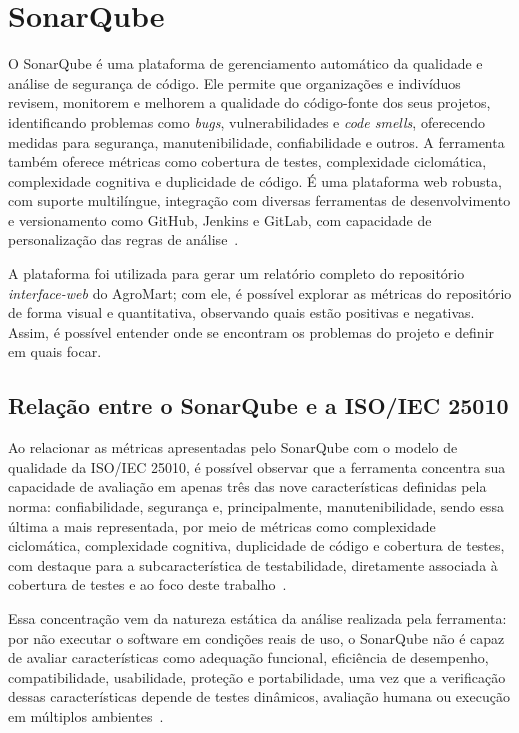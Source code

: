 
\section{SonarQube}

O SonarQube é uma plataforma de gerenciamento automático da qualidade e análise de segurança de código.
Ele permite que organizações e indivíduos revisem, monitorem e melhorem a qualidade do código-fonte dos seus projetos,
identificando problemas como \textit{bugs}, vulnerabilidades e \textit{code smells}, oferecendo medidas para segurança, manutenibilidade, confiabilidade e outros.
A ferramenta também oferece métricas como cobertura de testes, complexidade ciclomática, complexidade cognitiva e duplicidade de código.
É uma plataforma web robusta, com suporte multilíngue, integração com diversas ferramentas de desenvolvimento e versionamento como GitHub, Jenkins e GitLab,
com capacidade de personalização das regras de análise~\cite{sonarqube}.

A plataforma foi utilizada para gerar um relatório completo do repositório \textit{interface-web} do AgroMart; com ele, é possível explorar as métricas do repositório de forma visual e quantitativa,
observando quais estão positivas e negativas. Assim, é possível entender onde se encontram os problemas do projeto e definir em quais focar.


\subsection{Relação entre o SonarQube e a ISO/IEC 25010}

Ao relacionar as métricas apresentadas pelo SonarQube com o modelo de qualidade da ISO/IEC 25010, é possível observar que a ferramenta concentra sua capacidade de avaliação em apenas três das nove características definidas pela norma: confiabilidade, segurança e, principalmente, manutenibilidade, sendo essa última a mais representada, por meio de métricas como complexidade ciclomática, complexidade cognitiva, duplicidade de código e cobertura de testes, com destaque para a subcaracterística de testabilidade, diretamente associada à cobertura de testes e ao foco deste trabalho~\cite{iso25010,sonarqube}.

Essa concentração vem da natureza estática da análise realizada pela ferramenta: por não executar o software em condições reais de uso, o SonarQube não é capaz de avaliar características como adequação funcional, eficiência de desempenho, compatibilidade, usabilidade, proteção e portabilidade, uma vez que a verificação dessas características depende de testes dinâmicos, avaliação humana ou execução em múltiplos ambientes~\cite{iso25010}.

